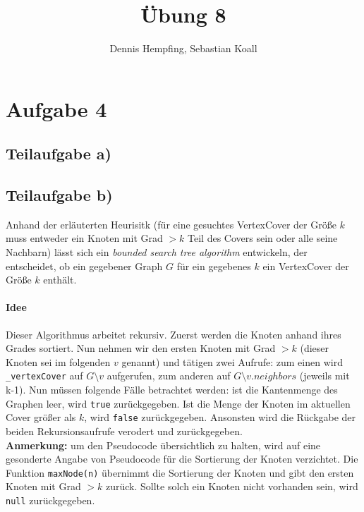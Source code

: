 \documentclass[12pt]{scrartcl}%
\theoremstyle{nonumberplain}
\newcommand{\code}[1]{\lstinline[basicstyle=\ttfamily\color{black}]{#1}}
\begin{document}
\author{Dennis Hempfing, Sebastian Koall}
\title{Übung 8}
\date{} 
\pagestyle{myheadings}

\maketitle %

\section*{Aufgabe 4}

\subsection*{Teilaufgabe a)}



\subsection*{Teilaufgabe b)}

Anhand der erläuterten Heurisitk (für eine gesuchtes {\sc VertexCover} der Größe $k$ muss entweder ein Knoten mit Grad $> k$ Teil des Covers sein oder alle seine Nachbarn) lässt sich ein \textit{bounded search tree algorithm} entwickeln, der entscheidet, ob ein gegebener Graph $G$ für ein gegebenes $k$ ein {\sc VertexCover} der Größe $k$ enthält.

\paragraph{Idee} Dieser Algorithmus arbeitet rekursiv. Zuerst werden die Knoten anhand ihres Grades sortiert. Nun nehmen wir den ersten Knoten mit Grad $> k$ (dieser Knoten sei im folgenden $v$ genannt) und tätigen zwei Aufrufe: zum einen wird \code{_vertexCover} auf $G\setminus v$ aufgerufen, zum anderen auf $G\setminus v.neighbors$ (jeweils mit k-1). Nun müssen folgende Fälle betrachtet werden: ist die Kantenmenge des Graphen leer, wird \code{true} zurückgegeben. Ist die Menge der Knoten im aktuellen Cover größer als $k$, wird \code{false} zurückgegeben. Ansonsten wird die Rückgabe der beiden Rekursionsaufrufe verodert und zurückgegeben.\\

\textbf{Anmerkung:} um den Pseudocode übersichtlich zu halten, wird auf eine gesonderte Angabe von Pseudocode für die Sortierung der Knoten verzichtet. Die Funktion \code{maxNode(n)} übernimmt die Sortierung der Knoten und gibt den ersten Knoten mit Grad $> k$ zurück. Sollte solch ein Knoten nicht vorhanden sein, wird \code{null} zurückgegeben.
\end{document}
